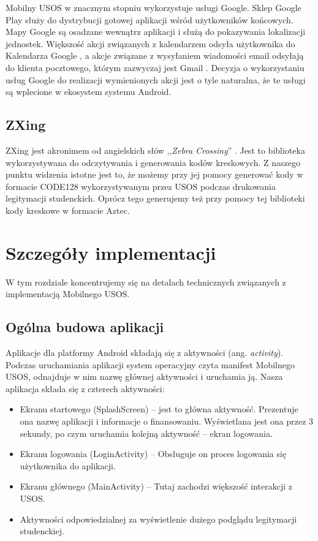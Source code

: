 \documentclass{pracamgr}
\begin{document}
Mobilny USOS w znacznym stopniu wykorzystuje usługi Google. Sklep Google Play
\cite{googleplay} służy do dystrybucji gotowej aplikacji wśród użytkowników
końcowych. Mapy Google \cite{googlemaps} są osadzane wewnątrz aplikacji i służą
do pokazywania lokalizacji jednostek. Większość akcji związanych z kalendarzem
odsyła użytkownika do Kalendarza Google \cite{googlecalendar}, a akcje związane
z wysyłaniem wiadomości email odsyłają do klienta pocztowego, którym zazwyczaj
jest Gmail \cite{gmail}. Decyzja o wykorzystaniu usług Google do realizacji
wymienionych akcji jest o tyle naturalna, że te usługi są wplecione w ekosystem
systemu Android.

\section{ZXing}

ZXing jest akronimem od angielskich słów ,,\textit{Zebra Crossing}'' \cite{zxing}.
Jest to biblioteka wykorzystywana do odczytywania i generowania kodów kreskowych.
Z naszego punktu widzenia istotne jest to, że możemy przy jej pomocy generować
kody w formacie CODE128 wykorzystywanym przez USOS podczas drukowania legitymacji
studenckich. Oprócz tego generujemy też przy pomocy tej biblioteki kody kreskowe
w formacie Aztec.

\chapter{Szczegóły implementacji}

W tym rozdziale koncentrujemy się na detalach technicznych związanych z implementacją
Mobilnego USOS.

\section{Ogólna budowa aplikacji}

Aplikacje dla platformy Android składają się z aktywności (ang. \textit{activity}).
Podczas uruchamiania aplikacji system operacyjny czyta manifest Mobilnego USOS,
odnajduje w nim nazwę głównej aktywności i uruchamia ją. Nasza aplikacja składa
się z czterech aktywności:

\begin{itemize}
	\item Ekranu startowego (SplashScreen) -- jest to główna aktywność.
	      Prezentuje ona nazwę aplikacji i informacje o finansowaniu. Wyświetlana
	      jest ona przez 3 sekundy, po czym uruchamia kolejną aktywność -- ekran
	      logowania.
	\item Ekranu logowania (LoginActivity) -- Obsługuje on proces logowania się
	      użytkownika do aplikacji.
	\item Ekranu głównego (MainActivity) -- Tutaj zachodzi większość interakcji
	      z USOS.
	\item Aktywności odpowiedzialnej za wyświetlenie dużego podglądu legitymacji
	      studenckiej.
\end{itemize}
\end{document}
